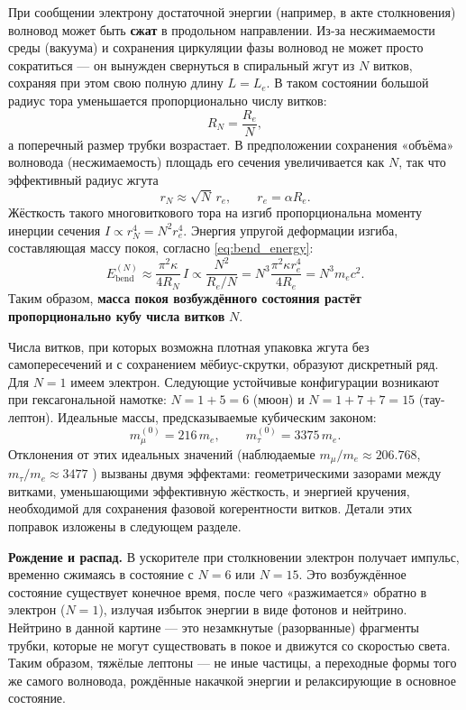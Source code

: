 \documentclass[12pt,a4paper]{article}
\begin{document}
При сообщении электрону достаточной энергии (например, в акте столкновения) волновод может быть \textbf{сжат} в продольном направлении. Из-за несжимаемости среды (вакуума) и сохранения циркуляции фазы волновод не может просто сократиться — он вынужден свернуться в спиральный жгут из $N$ витков, сохраняя при этом свою полную длину $L = L_e$. В таком состоянии большой радиус тора уменьшается пропорционально числу витков:
\begin{equation}
R_N = \frac{R_e}{N},
\label{eq:R_N}
\end{equation}
а поперечный размер трубки возрастает. В предположении сохранения «объёма» волновода (несжимаемость) площадь его сечения увеличивается как $N$, так что эффективный радиус жгута
\begin{equation}
r_N \approx \sqrt{N} \, r_e, \qquad r_e = \alpha R_e.
\label{eq:r_N}
\end{equation}
Жёсткость такого многовиткового тора на изгиб пропорциональна моменту инерции сечения $I \propto r_N^4 = N^2 r_e^4$. Энергия упругой деформации изгиба, составляющая массу покоя, согласно \eqref{eq:bend_energy}:
\begin{equation}
E_{\text{bend}}^{(N)} \approx \frac{\pi^2 \kappa}{4 R_N} \, I
\propto \frac{N^2}{R_e/N} = N^3 \frac{\pi^2 \kappa r_e^4}{4 R_e}
= N^3 m_e c^2.
\label{eq:E_bend_N}
\end{equation}
Таким образом, \textbf{масса покоя возбуждённого состояния растёт пропорционально кубу числа витков} $N$.

Числа витков, при которых возможна плотная упаковка жгута без самопересечений и с сохранением мёбиус-скрутки, образуют дискретный ряд. Для $N=1$ имеем электрон. Следующие устойчивые конфигурации возникают при гексагональной намотке: $N = 1+5 = 6$ (мюон) и $N = 1+7+7 = 15$ (тау-лептон). Идеальные массы, предсказываемые кубическим законом:
\begin{equation}
m_\mu^{(0)} = 216\,m_e, \qquad
m_\tau^{(0)} = 3375\,m_e.
\end{equation}
Отклонения от этих идеальных значений (наблюдаемые $m_\mu/m_e \approx 206.768$, $m_\tau/m_e \approx 3477$ \cite{pdg2024}) вызваны двумя эффектами: геометрическими зазорами между витками, уменьшающими эффективную жёсткость, и энергией кручения, необходимой для сохранения фазовой когерентности витков. Детали этих поправок изложены в следующем разделе.

\textbf{Рождение и распад.} В ускорителе при столкновении электрон получает импульс, временно сжимаясь в состояние с $N=6$ или $N=15$. Это возбуждённое состояние существует конечное время, после чего «разжимается» обратно в электрон ($N=1$), излучая избыток энергии в виде фотонов и нейтрино. Нейтрино в данной картине — это незамкнутые (разорванные) фрагменты трубки, которые не могут существовать в покое и движутся со скоростью света. Таким образом, тяжёлые лептоны — не иные частицы, а переходные формы того же самого волновода, рождённые накачкой энергии и релаксирующие в основное состояние.
\end{document}
